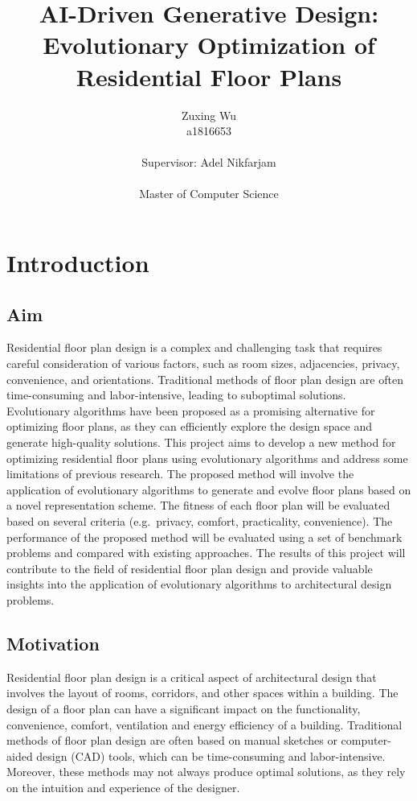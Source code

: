\documentclass[]{article}
\title{AI-Driven Generative Design: Evolutionary Optimization of Residential Floor Plans}
\author{Zuxing Wu\\a1816653\\ \\Supervisor: Adel Nikfarjam\\ \\Master of Computer Science}
\begin{document}
\maketitle\nonumber

\newpage\nonumber

\tableofcontents

\newpage


\section{Introduction}
\subsection{Aim}
Residential floor plan design is a complex and challenging task that requires careful consideration of various factors, such as room sizes, adjacencies, privacy, convenience, and orientations. Traditional methods of floor plan design are often time-consuming and labor-intensive, leading to suboptimal solutions. Evolutionary algorithms have been proposed as a promising alternative for optimizing floor plans, as they can efficiently explore the design space and generate high-quality solutions. This project aims to develop a new method for optimizing residential floor plans using evolutionary algorithms and address some limitations of previous research. The proposed method will involve the application of evolutionary algorithms to generate and evolve floor plans based on a novel representation scheme. The fitness of each floor plan will be evaluated based on several criteria (e.g.\ privacy, comfort, practicality, convenience). The performance of the proposed method will be evaluated using a set of benchmark problems and compared with existing approaches. The results of this project will contribute to the field of residential floor plan design and provide valuable insights into the application of evolutionary algorithms to architectural design problems.

\subsection{Motivation}
Residential floor plan design is a critical aspect of architectural design that involves the layout of rooms, corridors, and other spaces within a building. The design of a floor plan can have a significant impact on the functionality, convenience, comfort, ventilation and energy efficiency of a building. Traditional methods of floor plan design are often based on manual sketches or computer-aided design (CAD) tools, which can be time-consuming and labor-intensive. Moreover, these methods may not always produce optimal solutions, as they rely on the intuition and experience of the designer.
\end{document}
